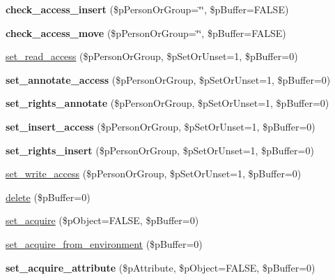 \begin{DoxyCompactItemize}
\item 
\hypertarget{classsteam__object_a5b4b92b7b3b9c442a5c4d5cef493fd9e}{
{\bfseries check\_\-access\_\-insert} (\$pPersonOrGroup=\char`\"{}\char`\"{}, \$pBuffer=FALSE)}
\label{classsteam__object_a5b4b92b7b3b9c442a5c4d5cef493fd9e}

\item 
\hypertarget{classsteam__object_a6b7f21f2c4d3b6cdaf57c511d57b66d4}{
{\bfseries check\_\-access\_\-move} (\$pPersonOrGroup=\char`\"{}\char`\"{}, \$pBuffer=FALSE)}
\label{classsteam__object_a6b7f21f2c4d3b6cdaf57c511d57b66d4}

\item 
\hyperlink{classsteam__object_a162285ae51ebe752b38a88fefd3ff789}{set\_\-read\_\-access} (\$pPersonOrGroup, \$pSetOrUnset=1, \$pBuffer=0)
\item 
\hypertarget{classsteam__object_ab7d2ae5bb5227ba00399c2090c6306de}{
{\bfseries set\_\-annotate\_\-access} (\$pPersonOrGroup, \$pSetOrUnset=1, \$pBuffer=0)}
\label{classsteam__object_ab7d2ae5bb5227ba00399c2090c6306de}

\item 
\hypertarget{classsteam__object_a634c34b999e85a1f6e2286b5b438c6d0}{
{\bfseries set\_\-rights\_\-annotate} (\$pPersonOrGroup, \$pSetOrUnset=1, \$pBuffer=0)}
\label{classsteam__object_a634c34b999e85a1f6e2286b5b438c6d0}

\item 
\hypertarget{classsteam__object_a7a1c52ae70a6a2ba5e9a7ff6739706dc}{
{\bfseries set\_\-insert\_\-access} (\$pPersonOrGroup, \$pSetOrUnset=1, \$pBuffer=0)}
\label{classsteam__object_a7a1c52ae70a6a2ba5e9a7ff6739706dc}

\item 
\hypertarget{classsteam__object_a23ea5dacca36884d073d41fa8b9cb6bb}{
{\bfseries set\_\-rights\_\-insert} (\$pPersonOrGroup, \$pSetOrUnset=1, \$pBuffer=0)}
\label{classsteam__object_a23ea5dacca36884d073d41fa8b9cb6bb}

\item 
\hyperlink{classsteam__object_aa21349c93ca63ff4d3a40b25d9887878}{set\_\-write\_\-access} (\$pPersonOrGroup, \$pSetOrUnset=1, \$pBuffer=0)
\item 
\hyperlink{classsteam__object_a256b0aeab04b4beaeb0aad90aebb3a68}{delete} (\$pBuffer=0)
\item 
\hyperlink{classsteam__object_a557a71ad0bf7e2856751edbc7ca04bc4}{set\_\-acquire} (\$pObject=FALSE, \$pBuffer=0)
\item 
\hyperlink{classsteam__object_addec485e8bff801b35e971b914aad811}{set\_\-acquire\_\-from\_\-environment} (\$pBuffer=0)
\item 
\hypertarget{classsteam__object_a62852272374d5dff50b5a63bf9a73a2e}{
{\bfseries set\_\-acquire\_\-attribute} (\$pAttribute, \$pObject=FALSE, \$pBuffer=0)}
\label{classsteam__object_a62852272374d5dff50b5a63bf9a73a2e}


\end{DoxyCompactItemize}

